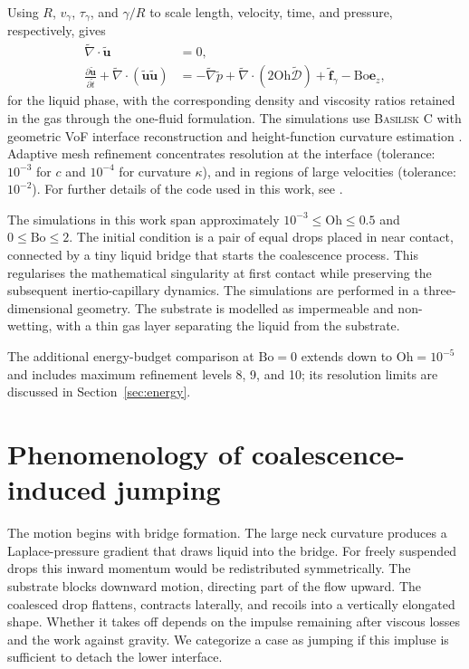 \documentclass[
reprint,
amsmath,amssymb,
superscriptaddress,
onecolumn,
aps,
prfluids,
longbibliography,
floatfix
]{revtex4-2}
\newcommand{\Oh}{\mathrm{Oh}}
\newcommand{\Bo}{\mathrm{Bo}}
\newcommand{\vgamma}{v_\gamma}
\newcommand{\taugamma}{\tau_\gamma}
\begin{document}
Using $R$, $\vgamma$, $\taugamma$, and $\gamma/R$ to scale length, velocity, time, and pressure, respectively, gives
\begin{align}
    \tilde{\nabla}\cdot\tilde{\bm{u}} &=0,\label{eq:continuity_nd}\\
    \frac{\partial \tilde{\bm{u}}}{\partial \tilde{t}}+\tilde{\nabla}\cdot(\tilde{\bm{u}}\tilde{\bm{u}})
    &= -\tilde{\nabla}\tilde{p} + \tilde{\nabla}\cdot\left(2\Oh\tilde{\bm{\mathcal{D}}}\right)+\tilde{\bm{f}}_{\gamma}-\Bo\bm{e}_z,
    \label{eq:momentum_nd}
\end{align}
for the liquid phase, with the corresponding density and viscosity ratios retained in the gas through the one-fluid formulation.
The simulations use \textsc{Basilisk C} with geometric VoF interface reconstruction and height-function curvature estimation \cite{popinet2009accurate,popinet2013basilisk,tryggvason2011direct,brackbill1992continuum}. Adaptive mesh refinement concentrates resolution at the interface (tolerance: $10^{-3}$ for $c$ and $10^{-4}$ for curvature $\kappa$), and in regions of large velocities (tolerance: $10^{-2}$). For further details of the code used in this work, see \cite{sanjay2025jumpingdrops}.

The simulations in this work span approximately $10^{-3}\le \Oh\le 0.5$ and $0\le \Bo\le 2$. The initial condition is a pair of equal drops placed in near contact, connected by a tiny liquid bridge that starts the coalescence process. This regularises the mathematical singularity \cite{eggers2025coalescence,sanjay2026singularities} at first contact while preserving the subsequent inertio-capillary dynamics. The simulations are performed in a three-dimensional geometry. The substrate is modelled as impermeable and non-wetting, with a thin gas layer separating the liquid from the substrate.

The additional energy-budget comparison at $\Bo=0$ extends down to $\Oh=10^{-5}$ and includes maximum refinement levels 8, 9, and 10; its resolution limits are discussed in Section~\ref{sec:energy}.

\section{Phenomenology of coalescence-induced jumping}\label{sec:phenomenology}

The motion begins with bridge formation. The large neck curvature produces a Laplace-pressure gradient that draws liquid into the bridge. For freely suspended drops this inward momentum would be redistributed symmetrically. The substrate blocks downward motion, directing part of the flow upward. The coalesced drop flattens, contracts laterally, and recoils into a vertically elongated shape. Whether it takes off depends on the impulse remaining after viscous losses and the work against gravity. We categorize a case as jumping if this impluse is sufficient to detach the lower interface.
\end{document}
